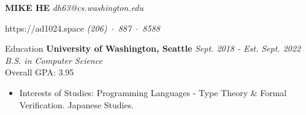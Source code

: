 \documentclass{resume}
\begin{document}
\MakeUppercase{\Large{\textbf{Mike He}}} \hfill {\em{dh63@cs.washington.edu}}
\vspace{-5pt}

https://ad1024.space \hfill{\em (206)~$\cdot$~887~$\cdot$~8588}


	\begin{rSection}{Education}
	{\bf University of Washington, Seattle} \hfill {\em Sept. 2018 - Est. Sept. 2022} \\
	\textit{B.S. in Computer Science} \\
	Overall GPA: 3.95
	\vspace{-5pt}
        \begin{itemize}[leftmargin=*]
            \setlength{\itemsep}{1pt}
            \setlength{\parskip}{0pt}
            \setlength{\parsep}{0pt}
            \item Interests of Studies: Programming Languages - Type Theory \& Formal Verification. Japanese Studies.
        \end{itemize}
	\end{rSection}
	\vspace{-5pt}
\end{document}

